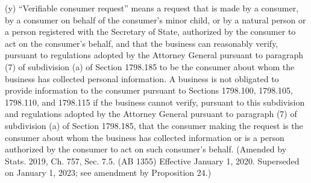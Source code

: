 (y) “Verifiable consumer request” means a request that is made by a consumer, by a consumer on behalf of the consumer’s minor child, or by a natural person or a person registered with the Secretary of State, authorized by the consumer to act on the consumer’s behalf, and that the business can reasonably verify, pursuant to regulations adopted by the Attorney General pursuant to paragraph (7) of subdivision (a) of Section 1798.185 to be the consumer about whom the business has collected personal information. A business is not obligated to provide information to the consumer pursuant to Sections 1798.100, 1798.105, 1798.110, and 1798.115 if the business cannot verify, pursuant to this subdivision and regulations adopted by the Attorney General pursuant to paragraph (7) of subdivision (a) of Section 1798.185, that the consumer making the request is the consumer about whom the business has collected information or is a person authorized by the consumer to act on such consumer’s behalf.
(Amended by Stats. 2019, Ch. 757, Sec. 7.5. (AB 1355) Effective January 1, 2020. Superseded on January 1, 2023; see amendment by Proposition 24.)

